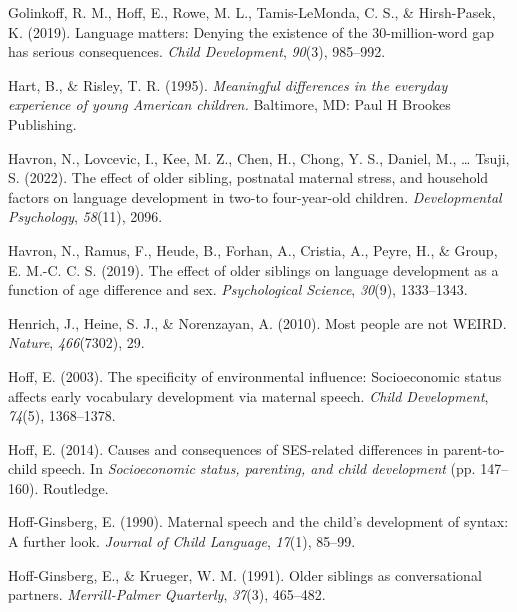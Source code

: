 \documentclass[
  man,floatsintext]{apa6}
\newlength{\cslhangindent}
\newlength{\cslentryspacingunit} %
\newenvironment{CSLReferences}[2] %
 {%
  \setlength{\parindent}{0pt}
  \ifodd #1
  \let\oldpar\par
  \def\par{\hangindent=\cslhangindent\oldpar}
  \fi
  \setlength{\parskip}{#2\cslentryspacingunit}
 }%
 {}
\begin{document}
\begin{CSLReferences}{1}{0}
\leavevmode{}%
Golinkoff, R. M., Hoff, E., Rowe, M. L., Tamis-LeMonda, C. S., \& Hirsh-Pasek, K. (2019). Language matters: Denying the existence of the 30-million-word gap has serious consequences. \emph{Child Development}, \emph{90}(3), 985--992.

\leavevmode{}%
Hart, B., \& Risley, T. R. (1995). \emph{Meaningful differences in the everyday experience of young {A}merican children.} Baltimore, MD: Paul H Brookes Publishing.

\leavevmode{}%
Havron, N., Lovcevic, I., Kee, M. Z., Chen, H., Chong, Y. S., Daniel, M., \ldots{} Tsuji, S. (2022). The effect of older sibling, postnatal maternal stress, and household factors on language development in two-to four-year-old children. \emph{Developmental Psychology}, \emph{58}(11), 2096.

\leavevmode{}%
Havron, N., Ramus, F., Heude, B., Forhan, A., Cristia, A., Peyre, H., \& Group, E. M.-C. C. S. (2019). The effect of older siblings on language development as a function of age difference and sex. \emph{Psychological Science}, \emph{30}(9), 1333--1343.

\leavevmode{}%
Henrich, J., Heine, S. J., \& Norenzayan, A. (2010). Most people are not WEIRD. \emph{Nature}, \emph{466}(7302), 29.

\leavevmode{}%
Hoff, E. (2003). The specificity of environmental influence: Socioeconomic status affects early vocabulary development via maternal speech. \emph{Child Development}, \emph{74}(5), 1368--1378.

\leavevmode{}%
Hoff, E. (2014). Causes and consequences of SES-related differences in parent-to-child speech. In \emph{Socioeconomic status, parenting, and child development} (pp. 147--160). Routledge.

\leavevmode{}%
Hoff-Ginsberg, E. (1990). Maternal speech and the child's development of syntax: A further look. \emph{Journal of Child Language}, \emph{17}(1), 85--99.

\leavevmode{}%
Hoff-Ginsberg, E., \& Krueger, W. M. (1991). Older siblings as conversational partners. \emph{Merrill-Palmer Quarterly}, \emph{37}(3), 465--482.


\end{CSLReferences}
\end{document}

